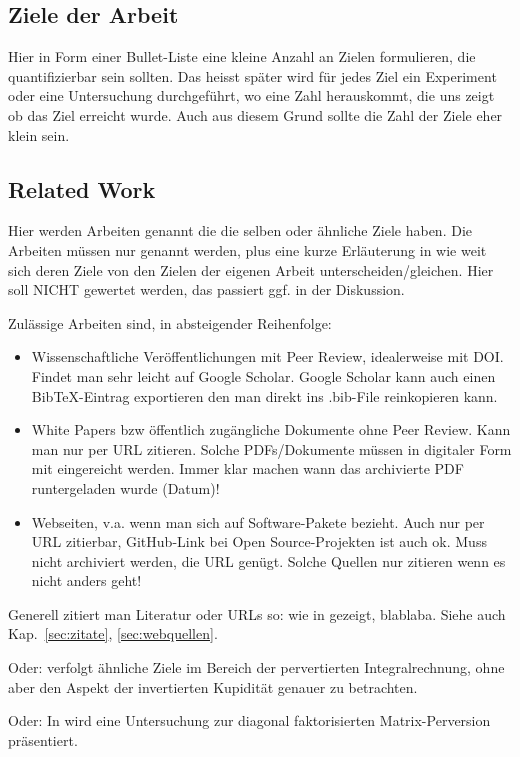 \documentclass[12pt,oneside]{article}
\begin{document}
\subsection{Ziele der Arbeit}
Hier in Form einer Bullet-Liste eine kleine Anzahl an Zielen formulieren, die quantifizierbar sein sollten. Das heisst später wird für jedes Ziel ein Experiment oder eine Untersuchung durchgeführt, wo eine Zahl herauskommt, die uns zeigt ob das Ziel erreicht wurde. Auch aus diesem Grund sollte die Zahl der Ziele eher klein sein.

\subsection{Related Work}
Hier werden Arbeiten genannt die die selben oder ähnliche Ziele haben. Die Arbeiten müssen nur genannt werden, plus eine kurze Erläuterung in wie weit sich deren Ziele von den Zielen der eigenen Arbeit unterscheiden/gleichen. Hier soll NICHT gewertet werden, das passiert ggf. in der Diskussion.

Zulässige Arbeiten sind, in absteigender Reihenfolge:
\begin{itemize}
\item Wissenschaftliche Veröffentlichungen mit Peer Review, idealerweise mit DOI. Findet man sehr leicht auf Google Scholar. Google Scholar kann auch einen BibTeX-Eintrag exportieren den man direkt ins .bib-File reinkopieren kann.
\item White Papers bzw öffentlich zugängliche Dokumente ohne Peer Review. Kann man nur per URL zitieren. Solche PDFs/Dokumente müssen in digitaler Form mit eingereicht werden. Immer klar machen wann das archivierte PDF runtergeladen wurde (Datum)!
\item Webseiten, v.a. wenn man sich auf Software-Pakete bezieht. Auch nur per URL zitierbar, GitHub-Link bei Open Source-Projekten ist auch ok. Muss nicht archiviert werden, die URL genügt. Solche Quellen nur zitieren wenn es nicht anders geht!
\end{itemize}

Generell zitiert man Literatur oder URLs so: wie in \cite{clemen1989combining} gezeigt, blablaba. Siehe auch Kap.~\ref{sec:zitate}, \ref{sec:webquellen}.

Oder: \cite{clemen1989combining} verfolgt ähnliche Ziele im Bereich der pervertierten Integralrechnung, ohne aber den Aspekt der invertierten Kupidität genauer zu betrachten.

Oder: In \cite{clemen1989combining} wird eine Untersuchung zur diagonal faktorisierten Matrix-Perversion präsentiert.
\end{document}
